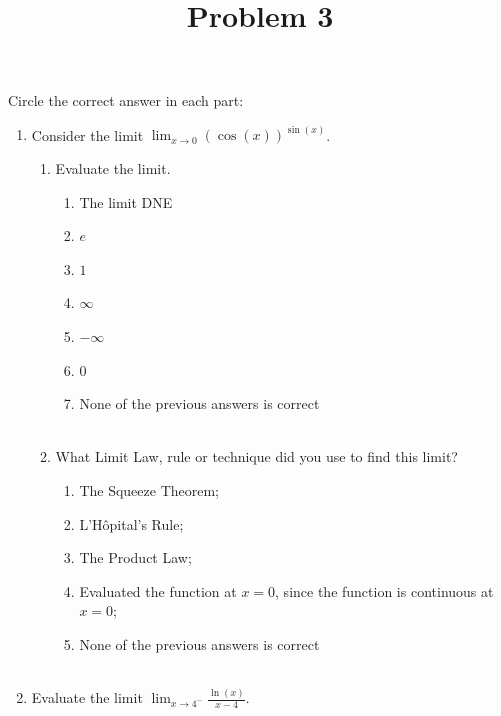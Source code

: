 \documentclass{ximera}
\title[Problem 3]{Problem 3}
\begin{document}
\begin{abstract} \end{abstract}
\maketitle

\begin{problem}

  Circle the correct answer in each part:
  \begin{enumerate}
    \item Consider the limit $\displaystyle \lim_{x \to 0} (\cos(x))^{\sin(x)}$.
      \begin{enumerate}
        \item Evaluate the limit.
         
          \begin{enumerate}
            \item The limit DNE
            \item $e$
             \item $1$
            \item $\infty$
            \item $-\infty$
            \item $0$
            \item None of the previous answers is correct\\ \\
          \end{enumerate}


          \item What Limit Law, rule or technique did you use to find this limit?
            \begin{enumerate}
            \item The Squeeze Theorem;
            \item L'H\^{o}pital's Rule;
            \item The Product Law;
            \item Evaluated the function at $x = 0$, since the function is continuous at $x = 0$;
            \item None of the previous answers is correct\\ \\
          \end{enumerate}
      \end{enumerate} 

    \item Evaluate the limit $\displaystyle \lim_{x \to 4^-} \frac{\ln(x)}{x - 4}$.
  

\end{enumerate}
\end{problem}
\end{document}
